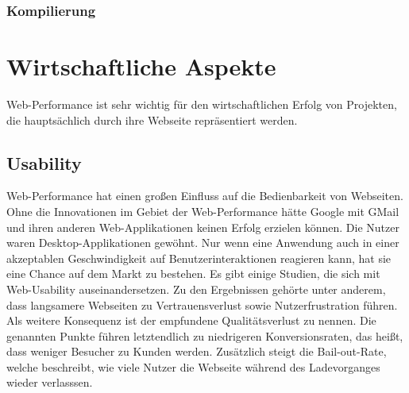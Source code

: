 \subsubsection{Kompilierung}


\section{Wirtschaftliche Aspekte}
Web-Performance ist sehr wichtig f\"ur den wirtschaftlichen Erfolg von Projekten, die haupts\"achlich durch ihre Webseite repr\"asentiert werden.
\subsection{Usability}
Web-Performance hat einen großen Einfluss auf die Bedienbarkeit von Webseiten. Ohne die Innovationen im Gebiet der Web-Performance hätte Google mit GMail und ihren anderen Web-Applikationen keinen Erfolg erzielen können. Die Nutzer waren Desktop-Applikationen gew\"ohnt. Nur wenn eine Anwendung auch in einer akzeptablen Geschwindigkeit auf Benutzerinteraktionen reagieren kann, hat sie eine Chance auf dem Markt zu bestehen. Es gibt einige Studien, die sich mit Web-Usability auseinandersetzen. Zu den Ergebnissen gehörte unter anderem, dass langsamere Webseiten zu Vertrauensverlust sowie Nutzerfrustration führen. Als weitere Konsequenz ist der empfundene Qualitätsverlust zu nennen. Die genannten Punkte führen letztendlich zu niedrigeren Konversionsraten, das heißt, dass weniger Besucher zu Kunden werden. Zus\"atzlich steigt die Bail-out-Rate, welche beschreibt, wie viele Nutzer die Webseite w\"ahrend des Ladevorganges wieder verlasssen.\citep{Toll2011}

